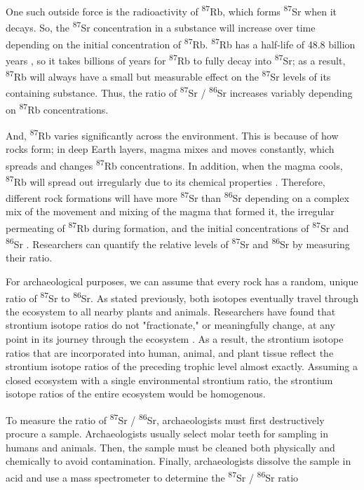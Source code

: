 \documentclass[a4paper, 12pt]{article}
\begin{document}
One such outside force is the radioactivity of \textsuperscript{87}Rb, which forms \textsuperscript{87}Sr when it decays. So, the \textsuperscript{87}Sr concentration in a substance
will increase over time depending on the initial concentration of \textsuperscript{87}Rb.
\textsuperscript{87}Rb has a half-life of 48.8 billion years \citep{holt2021}, so it takes billions of years
for \textsuperscript{87}Rb to fully decay into \textsuperscript{87}Sr; as a result, \textsuperscript{87}Rb will always
have a small but measurable effect on the \textsuperscript{87}Sr levels of its containing
substance.
Thus, the ratio of \textsuperscript{87}Sr / \textsuperscript{86}Sr
increases variably depending on \textsuperscript{87}Rb concentrations.

And, \textsuperscript{87}Rb varies significantly across the environment.
This is because of how rocks form; in deep Earth layers, magma mixes and moves constantly,
which spreads and changes \textsuperscript{87}Rb concentrations.
In addition, when the magma cools,
\textsuperscript{87}Rb will spread out irregularly due to its chemical properties \citep{holt2021}.
Therefore, different rock formations will have more
\textsuperscript{87}Sr than \textsuperscript{86}Sr depending on a complex mix of
the movement and mixing of the magma that formed it, the irregular permeating of
\textsuperscript{87}Rb during formation, and the initial concentrations of \textsuperscript{87}Sr and \textsuperscript{86}Sr \citep{Long1998}.
Researchers can quantify the relative levels of \textsuperscript{87}Sr and
\textsuperscript{86}Sr by measuring their ratio.


For archaeological purposes, we can assume that every rock has a random, unique
ratio of \textsuperscript{87}Sr to \textsuperscript{86}Sr. As stated previously,
both isotopes eventually travel through the ecosystem to all nearby
plants and animals. Researchers have found that strontium isotope ratios do not
"fractionate," or meaningfully change, at any point in its journey through
the ecosystem \cite{bartelink2019}. As a result, the strontium isotope ratios that are
incorporated into human, animal, and plant tissue reflect the strontium isotope
ratios of the preceding trophic level almost exactly. Assuming a closed ecosystem
with a single environmental strontium ratio,
the strontium isotope ratios of the entire ecosystem would be homogenous.

To measure the ratio of \textsuperscript{87}Sr / \textsuperscript{86}Sr, archaeologists must first
destructively procure a sample. Archaeologists usually select molar teeth
for sampling in humans and animals. Then, the sample must be cleaned both physically and chemically to avoid
contamination. Finally, archaeologists dissolve the sample in acid and
use a mass spectrometer to determine the
\textsuperscript{87}Sr / \textsuperscript{86}Sr ratio \citep{Long1998}
\end{document}
